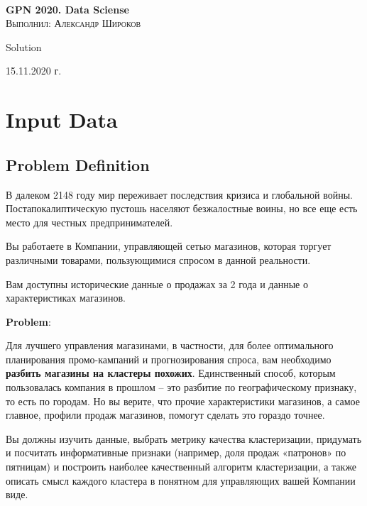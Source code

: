 \documentclass[%
10pt, %
final, %
oneside, %
onecolumn, %
centertags]{article} %
\theoremstyle{plain}
\theoremstyle{definition}
\theoremstyle{remark}
\begin{document}
\begin{titlepage} 
\begin{center}

\textbf{}\\[10.0cm]
\textbf{\LARGE GPN 2020. Data Sciense}\\[0.5cm]
\textsc{\large Выполнил: Александр Широков}

\vfill 

{\large {Solution}} \par
{\large {15.11.2020 г.}} 

\end{center} 
\end{titlepage}

\tableofcontents
\newpage

\section{Input Data}

\subsection{Problem Definition}

В далеком 2148 году мир переживает последствия кризиса и глобальной войны. Постапокалиптическую пустошь населяют безжалостные воины, но все еще есть место для честных предпринимателей.  

Вы работаете в Компании, управляющей сетью магазинов, которая торгует различными товарами, пользующимися спросом в данной реальности.

Вам доступны исторические данные о продажах за 2 года и данные о характеристиках магазинов.

\textbf{Problem}:

Для лучшего управления магазинами, в частности, для более оптимального планирования промо-кампаний и прогнозирования спроса, вам необходимо \textbf{разбить магазины на кластеры похожих}. Единственный способ, которым пользовалась компания в прошлом – это разбитие по географическому признаку, то есть по городам. Но вы верите, что прочие характеристики магазинов, а самое главное, профили продаж магазинов, помогут сделать это гораздо точнее.

Вы должны изучить данные, выбрать метрику качества кластеризации, придумать и посчитать информативные признаки (например, доля продаж «патронов» по пятницам) и построить наиболее качественный алгоритм кластеризации, а также описать смысл каждого кластера в понятном для управляющих вашей Компании виде.
\end{document}

